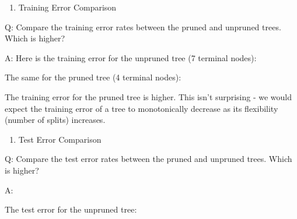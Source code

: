 \documentclass[
]{book}
\newenvironment{Shaded}{\begin{snugshade}}{\end{snugshade}}
\newcommand{\AttributeTok}[1]{\textcolor[rgb]{0.77,0.63,0.00}{#1}}
\newcommand{\CommentTok}[1]{\textcolor[rgb]{0.56,0.35,0.01}{\textit{#1}}}
\newcommand{\FunctionTok}[1]{\textcolor[rgb]{0.00,0.00,0.00}{#1}}
\newcommand{\NormalTok}[1]{#1}
\newcommand{\SpecialCharTok}[1]{\textcolor[rgb]{0.00,0.00,0.00}{#1}}
\newcommand{\StringTok}[1]{\textcolor[rgb]{0.31,0.60,0.02}{#1}}
\providecommand{\tightlist}{%
  \setlength{\itemsep}{0pt}\setlength{\parskip}{0pt}}
\begin{document}
\begin{enumerate}
\def\labelenumi{(\alph{enumi})}
\setcounter{enumi}{9}
\tightlist
\item
  Training Error Comparison
\end{enumerate}

Q: Compare the training error rates between the pruned and unpruned trees. Which is higher?

A:
Here is the training error for the unpruned tree (7 terminal nodes):

\begin{Shaded}
\end{Shaded}

The same for the pruned tree (4 terminal nodes):

\begin{Shaded}
\end{Shaded}

The training error for the pruned tree is higher. This isn't surprising - we would expect the training error of a tree to monotonically decrease as its flexibility (number of splits) increases.

\begin{enumerate}
\def\labelenumi{(\alph{enumi})}
\setcounter{enumi}{10}
\tightlist
\item
  Test Error Comparison
\end{enumerate}

Q: Compare the test error rates between the pruned and unpruned trees. Which is higher?

A:

The test error for the unpruned tree:

\begin{Shaded}
\end{Shaded}
\end{document}
